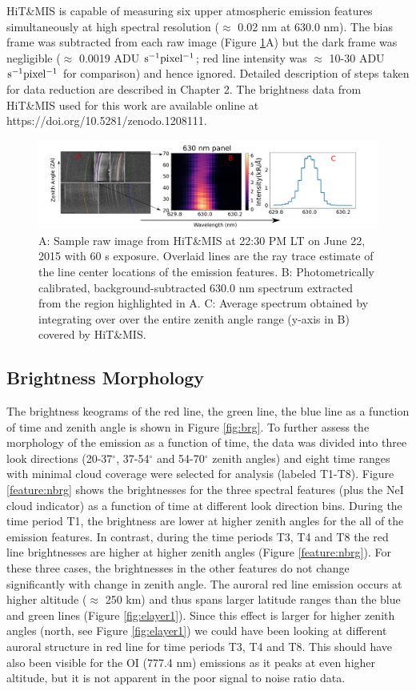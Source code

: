 \documentclass[crop=false,class=mitthesis,oneside,font=12pt]{standalone}
\begin{document}
HiT\&MIS is capable of measuring six upper atmospheric 
emission features simultaneously at high spectral resolution ($\approx$ 0.02 nm at 630.0 nm).
 The bias frame was subtracted from each raw image (Figure \ref{fig:raw}A) but the dark frame was negligible ($\approx{}$ 0.0019 ADU $\rm s^{-1} pixel^{-1}$; red line intensity was $\approx$ 10-30 ADU $\rm s^{-1} pixel^{-1}$ for comparison) and hence ignored. Detailed description of steps taken for data reduction are described in Chapter 2. The brightness data from HiT\&MIS used for this work are available online at https://doi.org/10.5281/zenodo.1208111.
\begin{figure}[H]
	\centering\includegraphics[width=35pc]{raw_spec.pdf}
	\caption{A: Sample raw image from HiT\&MIS at 22:30 PM LT on June 22, 2015 with 60 s exposure. Overlaid lines are the ray trace estimate of the line center locations of the emission features. B: Photometrically calibrated, background-subtracted 630.0 nm spectrum extracted from the region highlighted in A. C: Average spectrum obtained by integrating over 
		over the entire zenith angle range (y-axis in B) covered by HiT\&MIS.}
	\label{fig:raw}
\end{figure}


\subsection{Brightness Morphology} 
\label{sec:bmorph}
The brightness keograms of the red line, the green line, the blue line as a function of time and zenith angle is shown in Figure \ref{fig:brg}. To further assess the morphology of the emission as a function of time, the data was divided into three look directions (20-37$^\circ$, 37-54$^\circ$ and 54-70$^\circ$ zenith angles) and eight time ranges with minimal cloud coverage were selected for analysis (labeled T1-T8).
Figure \ref{feature:nbrg} shows the brightnesses for the three spectral features (plus the NeI cloud indicator) as a function of time at different look direction bins. During the time period T1, the brightness are lower at higher zenith angles for the all of the emission features. In contrast, during the time periods T3, T4 and T8 the red line brightnesses are higher at higher zenith angles (Figure \ref{feature:nbrg}). For these three cases, the brightnesses in the other features do not change significantly with change in zenith angle. The auroral red line emission occurs at higher altitude ($\approx$  250 km) and thus spans larger latitude ranges than the blue and green lines (Figure \ref{fig:elayer1}). Since this effect is larger for higher zenith angles (north, see Figure \ref{fig:elayer1}) we could have been looking at different auroral structure in red line for time periods T3, T4 and T8. 
This should have also been visible for the OI (777.4 nm) emissions as it peaks at even higher altitude, but it is not apparent in the poor signal to noise ratio data. 
\end{document}
